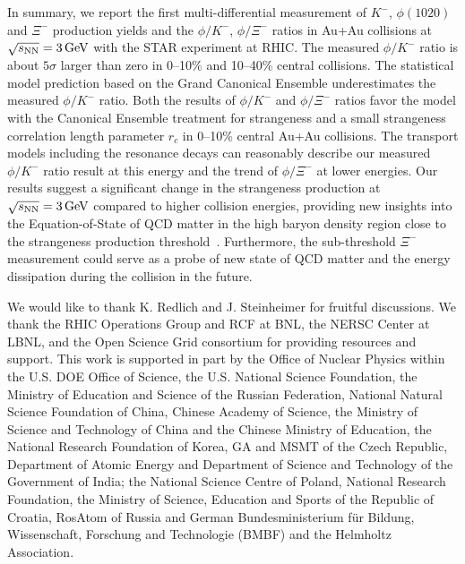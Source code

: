 \documentclass[%
 reprint,	
showpacs,
 amsmath,amssymb,
 aps,
 prc,
]{revtex4-1}
\begin{document}
In summary, we report the first multi-differential measurement of $K^-$, $\phi(1020)$ and $\Xi^{-}$ production yields  and the $\phi/K^-$, $\phi/\Xi^-$ ratios in Au+Au collisions at ${\sqrt{s_{\rm NN}} = \rm{3\,GeV}}$ with the STAR experiment at RHIC. The measured $\phi/K^-$ ratio is about $5\sigma$ larger than zero in 0--10\% and 10--40\% central collisions. The statistical model prediction based on the Grand Canonical Ensemble underestimates the measured $\phi/K^-$ ratio. Both the results of $\phi/K^-$ and $\phi/\Xi^-$ ratios favor the model with the Canonical Ensemble treatment for strangeness and a small strangeness correlation length parameter $r_c$ in 0--10\% central Au+Au collisions. The transport models including the resonance decays can reasonably describe our measured $\phi/K^-$ ratio result at this energy and the trend of $\phi/\Xi^-$ at lower energies. Our results suggest a significant change in the strangeness production at ${\sqrt{s_{\rm NN}} = \rm{3\,GeV}}$ compared to higher collision energies, providing new insights into the Equation-of-State of QCD matter in the high baryon density region close to the strangeness production threshold~\cite{KO_sQM17,yong2021double}. Furthermore, the sub-threshold $\Xi^-$ measurement could serve as a probe of new state of QCD matter and the energy dissipation during the collision in the future. 



We would like to thank K. Redlich and J. Steinheimer for fruitful discussions.
We thank the RHIC Operations Group and RCF at BNL, the NERSC Center at LBNL, and the Open Science Grid consortium for providing resources and support. This work is supported in part by the Office of Nuclear Physics within the U.S. DOE Office of Science, the U.S. National Science Foundation, the Ministry of Education and Science of the Russian Federation, National Natural Science Foundation of China, Chinese Academy of Science, the Ministry of Science and Technology of China and the Chinese Ministry of Education, the National Research Foundation of Korea, GA and MSMT of the Czech Republic, Department of Atomic Energy and Department of Science and Technology of the Government of India; the National Science Centre of Poland, National Research Foundation, the Ministry of Science, Education and Sports of the Republic of Croatia, RosAtom of Russia and German Bundesministerium f{\"u}r Bildung, Wissenschaft, Forschung and Technologie (BMBF) and the Helmholtz Association.


\end{document}
